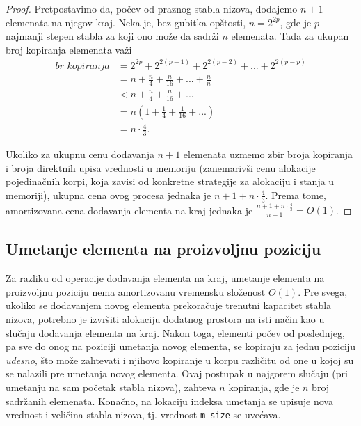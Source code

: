 \documentclass[a4paper]{article}
\begin{document}
\begin{proof}
Pretpostavimo da, počev od praznog stabla nizova, dodajemo $n + 1$ elemenata na njegov kraj. Neka je, bez gubitka opštosti, $n = 2^{2p}$, gde je $p$ najmanji stepen stabla za koji ono može da sadrži $n$ elemenata. Tada za ukupan broj kopiranja elemenata važi
\begin{equation}
\begin{split}
    br\_kopiranja &= 2^{2p} + 2^{2(p - 1)} + 2^{2(p - 2)} + ... + 2^{2(p - p)} \\
    &= n + \frac{n}{4} + \frac{n}{16} + ... + \frac{n}{n} \\
    &< n + \frac{n}{4} + \frac{n}{16} + ... \\
    &= n(1 + \frac{1}{4} + \frac{1}{16} + ...) \\
    &= n \cdot \frac{4}{3}.
\end{split}
\end{equation}

Ukoliko za ukupnu cenu dodavanja $n + 1$ elemenata uzmemo zbir broja kopiranja i broja direktnih upisa vrednosti u memoriju (zanemarivši cenu alokacije pojedinačnih korpi, koja zavisi od konkretne strategije za alokaciju i stanja u memoriji), ukupna cena ovog procesa jednaka je $n + 1 + n \cdot \frac{4}{3}$. Prema tome, amortizovana cena dodavanja elementa na kraj jednaka je $\frac{n + 1 + n \cdot \frac{4}{3}}{n + 1} = O(1)$.
\end{proof}

\subsection{Umetanje elementa na proizvoljnu poziciju}

Za razliku od operacije dodavanja elementa na kraj, umetanje elementa na proizvoljnu poziciju nema amortizovanu vremensku složenost $O(1)$. Pre svega, ukoliko se dodavanjem novog elementa prekoračuje trenutni kapacitet stabla nizova, potrebno je izvršiti alokaciju dodatnog prostora na isti način kao u slučaju dodavanja elementa na kraj. Nakon toga, elementi počev od poslednjeg, pa sve do onog na poziciji umetanja novog elementa, se kopiraju za jednu poziciju \textit{udesno}, što može zahtevati i njihovo kopiranje u korpu različitu od one u kojoj su se nalazili pre umetanja novog elementa. Ovaj postupak u najgorem slučaju (pri umetanju na sam početak stabla nizova), zahteva $n$ kopiranja, gde je $n$ broj sadržanih elemenata. Konačno, na lokaciju indeksa umetanja se upisuje nova vrednost i veličina stabla nizova, tj. vrednost \verb|m_size| se uvećava.
\end{document}
